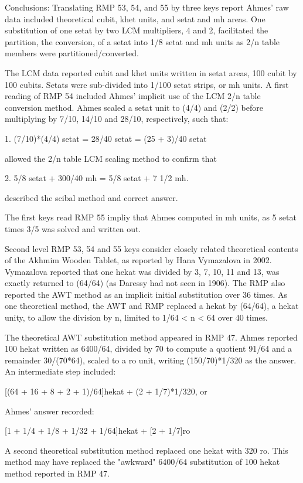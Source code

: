 \documentclass[12pt]{article}
\begin{document}
Conclusions: Translating  RMP 53, 54, and 55 by three keys report Ahmes' raw data included theoretical cubit,  khet units, and setat and mh areas. One substitution of one setat by two LCM multipliers, 4 and 2, facilitated the partition, the conversion, of a setat into 1/8 setat and mh units as 2/n table members were partitioned/converted.

The LCM data reported cubit and khet units written in setat areas, 100 cubit by 100 cubits. Setats were sub-divided into 1/100 setat strips, or mh units. A first reading of RMP 54 included Ahmes' implicit use of the LCM 2/n table conversion method. Ahmes scaled a setat unit to (4/4) and (2/2) before multiplying by 7/10, 14/10 and 28/10, respectively, such that:

1. (7/10)*(4/4) setat = 28/40 setat = (25 + 3)/40 setat

allowed the 2/n table LCM scaling method to confirm that

2. 5/8 setat + 300/40 mh = 5/8 setat + 7 1/2 mh.

described the scibal method and correct answer.

The first keys read RMP 55 impliy that Ahmes computed in mh units, as 5 setat times 3/5 was solved and written out.

Second level RMP 53, 54 and 55 keys consider closely related theoretical contents of the Akhmim Wooden Tablet, as reported by Hana Vymazalova in 2002. Vymazalova reported that one hekat was divided by 3, 7, 10, 11 and 13, was exactly returned to (64/64) (as Daressy had not seen in 1906). The RMP also reported the AWT method as an implicit initial substitution over 36 times. As one theoretical method, the AWT and RMP replaced a hekat by (64/64), a hekat unity, to allow the division by n, limited to 1/64 < n < 64 over 40 times.

The theoretical AWT substitution method appeared in RMP 47. Ahmes reported 100 hekat written as 6400/64, divided by 70 to compute a quotient 91/64 and a remainder 30/(70*64), scaled to a ro unit, writing (150/70)*1/320 as the answer. An intermediate step included:

[(64 + 16 + 8 + 2 + 1)/64]hekat + (2 + 1/7)*1/320, or

Ahmes' answer recorded:

[1 + 1/4 + 1/8 + 1/32 + 1/64]hekat + [2 + 1/7]ro

A second theoretical substitution method replaced one hekat with 320 ro. This method may have replaced the "awkward" 6400/64 substitution of 100 hekat method reported in RMP 47.
\end{document}
